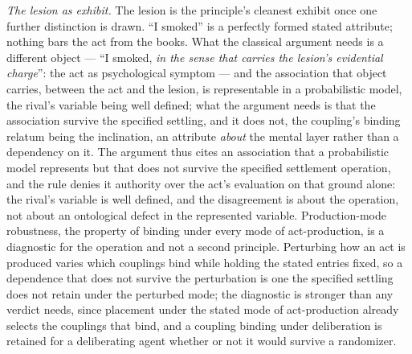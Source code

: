 \textit{The lesion as exhibit.} The lesion is the principle's cleanest exhibit once one further distinction is drawn. ``I smoked'' is a perfectly formed stated attribute; nothing bars the act from the books. What the classical argument needs is a different object --- ``I smoked, \emph{in the sense that carries the lesion's evidential charge}'': the act as psychological symptom --- and the association that object carries, between the act and the lesion, is representable in a probabilistic model, the rival's variable being well defined; what the argument needs is that the association survive the specified settling, and it does not, the coupling's binding relatum being the inclination, an attribute \emph{about} the mental layer rather than a dependency on it. The argument thus cites an association that a probabilistic model represents but that does not survive the specified settlement operation, and the rule denies it authority over the act's evaluation on that ground alone: the rival's variable is well defined, and the disagreement is about the operation, not about an ontological defect in the represented variable. Production-mode robustness, the property of binding under every mode of act-production, is a diagnostic for the operation and not a second principle. Perturbing how an act is produced varies which couplings bind while holding the stated entries fixed, so a dependence that does not survive the perturbation is one the specified settling does not retain under the perturbed mode; the diagnostic is stronger than any verdict needs, since placement under the stated mode of act-production already selects the couplings that bind, and a coupling binding under deliberation is retained for a deliberating agent whether or not it would survive a randomizer.


